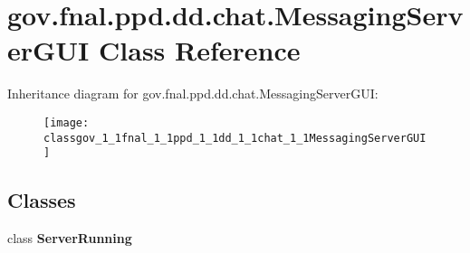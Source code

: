 \hypertarget{classgov_1_1fnal_1_1ppd_1_1dd_1_1chat_1_1MessagingServerGUI}{\section{gov.\-fnal.\-ppd.\-dd.\-chat.\-Messaging\-Server\-G\-U\-I Class Reference}
\label{classgov_1_1fnal_1_1ppd_1_1dd_1_1chat_1_1MessagingServerGUI}
}
Inheritance diagram for gov.\-fnal.\-ppd.\-dd.\-chat.\-Messaging\-Server\-G\-U\-I\-:\begin{figure}[H]
\begin{center}
\leavevmode
\texttt{[image: classgov\_1\_1fnal\_1\_1ppd\_1\_1dd\_1\_1chat\_1\_1MessagingServerGUI]}
\end{center}
\end{figure}
\subsection*{Classes}
\begin{DoxyCompactItemize}
\item 
class {\bfseries Server\-Running}
\end{DoxyCompactItemize}
